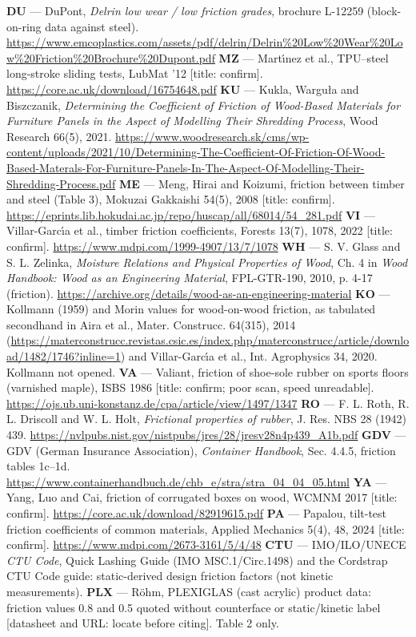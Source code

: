  \textbf{DU} --- DuPont, \emph{Delrin low wear / low friction grades}, brochure L-12259 (block-on-ring data against steel). \url{https://www.emcoplastics.com/assets/pdf/delrin/Delrin%20Low%20Wear%20Low%20Friction%20Brochure%20Dupont.pdf}
 \textbf{MZ} --- Mart\'{\i}nez et al., TPU--steel long-stroke sliding tests, LubMat '12 [title: confirm]. \url{https://core.ac.uk/download/16754648.pdf}
 \textbf{KU} --- Kukla, Wargu\l{}a and Biszczanik, \emph{Determining the Coefficient of Friction of Wood-Based Materials for Furniture Panels in the Aspect of Modelling Their Shredding Process}, Wood Research 66(5), 2021. \url{https://www.woodresearch.sk/cms/wp-content/uploads/2021/10/Determining-The-Coefficient-Of-Friction-Of-Wood-Based-Materals-For-Furniture-Panels-In-The-Aspect-Of-Modelling-Their-Shredding-Process.pdf}
 \textbf{ME} --- Meng, Hirai and Koizumi, friction between timber and steel (Table 3), Mokuzai Gakkaishi 54(5), 2008 [title: confirm]. \url{https://eprints.lib.hokudai.ac.jp/repo/huscap/all/68014/54_281.pdf}
 \textbf{VI} --- Villar-Garc\'{\i}a et al., timber friction coefficients, Forests 13(7), 1078, 2022 [title: confirm]. \url{https://www.mdpi.com/1999-4907/13/7/1078}
 \textbf{WH} --- S. V. Glass and S. L. Zelinka, \emph{Moisture Relations and Physical Properties of Wood}, Ch. 4 in \emph{Wood Handbook: Wood as an Engineering Material}, FPL-GTR-190, 2010, p. 4-17 (friction). \url{https://archive.org/details/wood-as-an-engineering-material}
 \textbf{KO} --- Kollmann (1959) and Morin values for wood-on-wood friction, as tabulated secondhand in Aira et al., Mater. Construcc. 64(315), 2014 (\url{https://materconstrucc.revistas.csic.es/index.php/materconstrucc/article/download/1482/1746?inline=1}) and Villar-Garc\'{\i}a et al., Int. Agrophysics 34, 2020. Kollmann not opened.
 \textbf{VA} --- Valiant, friction of shoe-sole rubber on sports floors (varnished maple), ISBS 1986 [title: confirm; poor scan, speed unreadable]. \url{https://ojs.ub.uni-konstanz.de/cpa/article/view/1497/1347}
 \textbf{RO} --- F. L. Roth, R. L. Driscoll and W. L. Holt, \emph{Frictional properties of rubber}, J. Res. NBS 28 (1942) 439. \url{https://nvlpubs.nist.gov/nistpubs/jres/28/jresv28n4p439_A1b.pdf}
 \textbf{GDV} --- GDV (German Insurance Association), \emph{Container Handbook}, Sec. 4.4.5, friction tables 1c--1d. \url{https://www.containerhandbuch.de/chb_e/stra/stra_04_04_05.html}
 \textbf{YA} --- Yang, Luo and Cai, friction of corrugated boxes on wood, WCMNM 2017 [title: confirm]. \url{https://core.ac.uk/download/82919615.pdf}
 \textbf{PA} --- Papalou, tilt-test friction coefficients of common materials, Applied Mechanics 5(4), 48, 2024 [title: confirm]. \url{https://www.mdpi.com/2673-3161/5/4/48}
 \textbf{CTU} --- IMO/ILO/UNECE \emph{CTU Code}, Quick Lashing Guide (IMO MSC.1/Circ.1498) and the Cordstrap CTU Code guide: static-derived design friction factors (not kinetic measurements).
 \textbf{PLX} --- R\"{o}hm, PLEXIGLAS (cast acrylic) product data: friction values 0.8 and 0.5 quoted without counterface or static/kinetic label [datasheet and URL: locate before citing]. Table 2 only.

